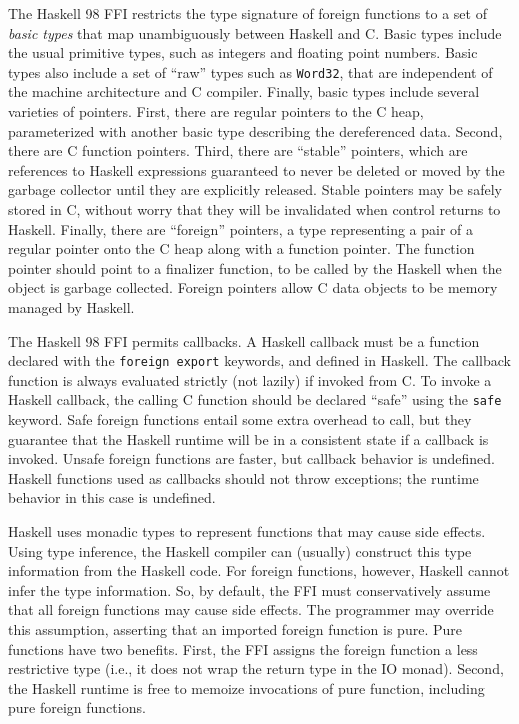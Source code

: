 The Haskell 98 FFI restricts the type signature of foreign functions to a set of \emph{basic types} that map unambiguously between Haskell and C. Basic types include the usual primitive types, such as integers and floating point numbers. Basic types also include a set of ``raw'' types such as \texttt{Word32}, that are independent of the machine architecture and C compiler. Finally, basic types include several varieties of pointers. First, there are regular pointers to the C heap, parameterized with another basic type describing the dereferenced data. Second, there are C function pointers. Third, there are ``stable'' pointers, which are references to Haskell expressions guaranteed to never be deleted or moved by the garbage collector until they are explicitly released. Stable pointers may be safely stored in C, without worry that they will be invalidated when control returns to Haskell. Finally, there are ``foreign'' pointers, a type representing a pair of a regular pointer onto the C heap along with a function pointer. The function pointer should point to a finalizer function, to be called by the Haskell when the object is garbage collected. Foreign pointers allow C data objects to be memory managed by Haskell.

The Haskell 98 FFI permits callbacks. A Haskell callback must be a function declared with the \texttt{foreign export} keywords, and defined in Haskell. The callback function is always evaluated strictly (not lazily) if invoked from C. To invoke a Haskell callback, the calling C function should be declared ``safe'' using the \texttt{safe} keyword. Safe foreign functions entail some extra overhead to call, but they guarantee that the Haskell runtime will be in a consistent state if a callback is invoked. Unsafe foreign functions are faster, but callback behavior is undefined. Haskell functions used as callbacks should not throw exceptions; the runtime behavior in this case is undefined.

Haskell uses monadic types to represent functions that may cause side effects. Using type inference, the Haskell compiler can (usually) construct this type information from the Haskell code. For foreign functions, however, Haskell cannot infer the type information. So, by default, the FFI must conservatively assume that all foreign functions may cause side effects. The programmer may override this assumption, asserting that an imported foreign function is pure. Pure functions have two benefits. First, the FFI assigns the foreign function a less restrictive type (i.e., it does not wrap the return type in the IO monad). Second, the Haskell runtime is free to memoize invocations of pure function, including pure foreign functions.

